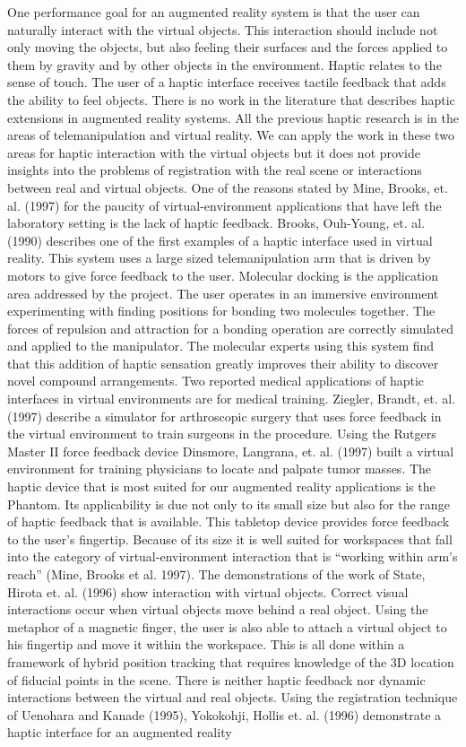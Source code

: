 One performance goal for an augmented reality system is that the user can naturally interact with the virtual objects. This interaction should include not only moving the objects, but also feeling their surfaces and the forces applied to them by gravity and by other objects in the environment. Haptic relates to the sense of touch. The user of a haptic interface receives tactile feedback that adds the ability to feel objects. There is no work in the literature that describes haptic extensions in augmented reality systems. All the previous haptic research is in the areas of telemanipulation and virtual reality. We can apply the work in these two areas for haptic interaction with the virtual objects but it does not provide insights into the problems of registration with the real scene or interactions between real and virtual objects. One of the reasons stated by Mine, Brooks, et. al. (1997) for the paucity of virtual-environment applications that have left the laboratory setting is the lack of haptic feedback. Brooks, Ouh-Young, et. al. (1990) describes one of the first examples of a haptic interface used in virtual reality. This system uses a large sized telemanipulation arm that is driven by motors to give force feedback to the user. Molecular docking is the application area addressed by the project. The user operates in an immersive environment experimenting with finding positions for bonding two molecules together. The forces of repulsion and attraction for a bonding operation are correctly simulated and applied to the manipulator. The molecular experts using this system find that this addition of haptic sensation greatly improves their ability to discover novel compound arrangements. Two reported medical applications of haptic interfaces in virtual environments are for medical training. Ziegler, Brandt, et. al. (1997) describe a simulator for arthroscopic surgery that uses force feedback in the virtual environment to train surgeons in the procedure. Using the Rutgers Master II force feedback device Dinsmore, Langrana, et. al. (1997) built a virtual environment for training physicians to locate and palpate tumor masses. The haptic device that is most suited for our augmented reality applications is the Phantom. Its applicability is due not only to its small size but also for the range of haptic feedback that is available. This tabletop device provides force feedback to the user’s fingertip. Because of its size it is well suited for workspaces that fall into the category of virtual-environment interaction that is “working within arm’s reach” (Mine, Brooks et al. 1997). The demonstrations of the work of State, Hirota et. al. (1996) show interaction with virtual objects. Correct visual interactions occur when virtual objects move behind a real object. Using the metaphor of a magnetic finger, the user is also able to attach a virtual object to his fingertip and move it within the workspace. This is all done within a framework of hybrid position tracking that requires knowledge of the 3D location of fiducial points in the scene. There is neither haptic feedback nor dynamic interactions between the virtual and real objects. Using the registration technique of Uenohara and Kanade (1995), Yokokohji, Hollis et. al. (1996) demonstrate a haptic interface for an augmented reality 